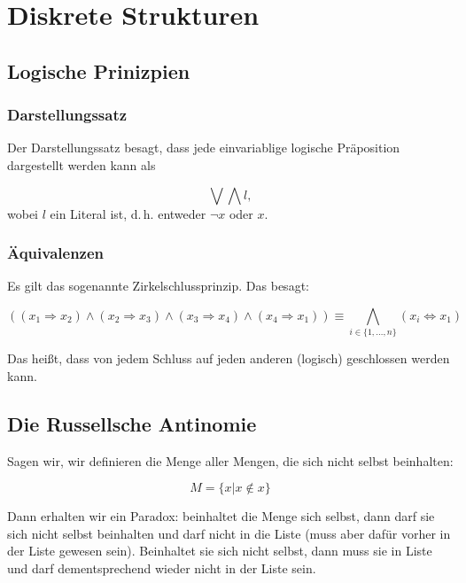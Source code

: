 \documentclass{scrartcl}
\begin{document}
\section{Diskrete Strukturen}

\subsection{Logische Prinizpien}

\subsubsection{Darstellungssatz}

Der Darstellungssatz besagt, %
dass jede einvariablige logische Präposition dargestellt werden kann als

\begin{equation}
	\bigvee\bigwedge l,
\end{equation}
wobei $l$ ein Literal ist, d.\,h. entweder $\lnot x$ oder $x$.

\subsubsection{Äquivalenzen}

Es gilt das sogenannte Zirkelschlussprinzip. Das besagt:

\begin{equation}
	\left(\left(x_1 \Rightarrow x_2\right) \wedge \left(x_2 \Rightarrow x_3\right) \wedge \left(x_3 \Rightarrow x_4\right) \wedge \left(x_4 \Rightarrow x_1\right)\right) \equiv \bigwedge_{i \in \{1, \dots, n\}} \left(x_i \Leftrightarrow x_1 \right)
\end{equation}

Das heißt, dass von jedem Schluss auf jeden anderen (logisch) geschlossen werden kann.

\subsection{Die Russellsche Antinomie}

Sagen wir, wir definieren die Menge aller Mengen, die sich nicht selbst beinhalten:

\begin{equation}
	M = \{x | x \not\in x\}
\end{equation}

Dann erhalten wir ein Paradox: beinhaltet die Menge sich selbst, dann darf sie sich nicht
selbst beinhalten und darf nicht in die Liste (muss aber dafür vorher in der Liste gewesen sein).
Beinhaltet sie sich nicht selbst, dann muss sie in Liste und darf dementsprechend wieder nicht in
der Liste sein.
\end{document}
